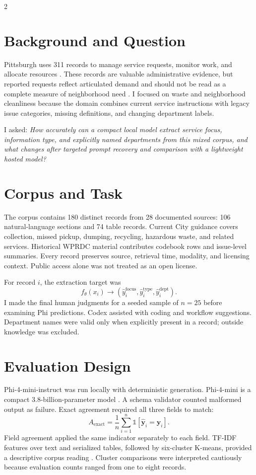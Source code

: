\documentclass[9pt]{article}
\begin{document}
\vspace{-3pt}
\begin{multicols}{2}
\section{Background and Question}
Pittsburgh uses 311 records to manage service requests, monitor work, and allocate resources \cite{wprdcguide}. These records are valuable administrative evidence, but reported requests reflect articulated demand and should not be read as a complete measure of neighborhood need \cite{whitetrump}. I focused on waste and neighborhood cleanliness because the domain combines current service instructions with legacy issue categories, missing definitions, and changing department labels.

I asked: \emph{How accurately can a compact local model extract service focus, information type, and explicitly named departments from this mixed corpus, and what changes after targeted prompt recovery and comparison with a lightweight hosted model?}

\section{Corpus and Task}
The corpus contains 180 distinct records from 28 documented sources: 106 natural-language sections and 74 table records. Current City guidance covers collection, missed pickup, dumping, recycling, hazardous waste, and related services. Historical WPRDC material contributes codebook rows and issue-level summaries. Every record preserves source, retrieval time, modality, and licensing context. Public access alone was not treated as an open license.

For record $i$, the extraction target was
\[
 f_{\theta}(x_i) \rightarrow
 (\hat y_i^{\mathrm{focus}},\hat y_i^{\mathrm{type}},
 \hat y_i^{\mathrm{dept}}).
\]
I made the final human judgments for a seeded sample of $n=25$ before examining Phi predictions. Codex assisted with coding and workflow suggestions. Department names were valid only when explicitly present in a record; outside knowledge was excluded.

\section{Evaluation Design}
Phi-4-mini-instruct was run locally with deterministic generation. Phi-4-mini is a compact 3.8-billion-parameter model \cite{phi4mini}. A schema validator counted malformed output as failure. Exact agreement required all three fields to match:
\[
 A_{\mathrm{exact}}=\frac{1}{n}\sum_{i=1}^{n}
 \mathbb{1}[\hat{\mathbf y}_i=\mathbf y_i].
\]
Field agreement applied the same indicator separately to each field. TF-IDF features over text and serialized tables, followed by six-cluster K-means, provided a descriptive corpus reading \cite{sklearn}. Cluster comparisons were interpreted cautiously because evaluation counts ranged from one to eight records.
\end{multicols}
\end{document}

